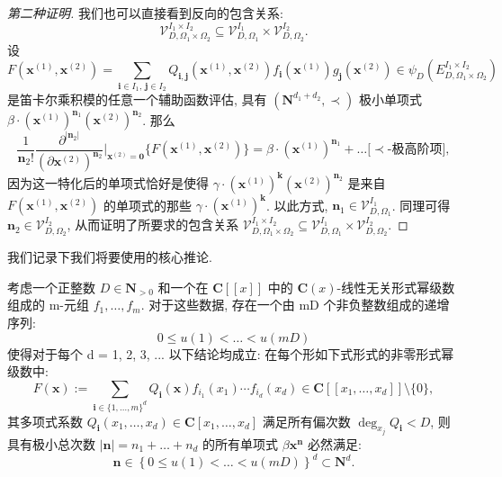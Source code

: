 \begin{proof}[第二种证明]
我们也可以直接看到反向的包含关系:
\[ \mathcal{V}_{D,\Omega_1\times\Omega_2}^{I_1\times I_2}\subseteq\mathcal{V}_{D,\Omega_1}^{I_1}\times\mathcal{V}_{D,\Omega_2}^{I_2}. \]
设
\[ F(\mathbf{x}^{(1)}, \mathbf{x}^{(2)}) = \sum_{\mathbf{i} \in I_1, \, \mathbf{j} \in I_2} Q_{\mathbf{i}, \mathbf{j}}(\mathbf{x}^{(1)}, \mathbf{x}^{(2)}) f_{\mathbf{i}}(\mathbf{x}^{(1)}) g_{\mathbf{j}}(\mathbf{x}^{(2)}) \in \psi_D\left(E_{D, \Omega_1 \times \Omega_2}^{I_1 \times I_2}\right) \]
是笛卡尔乘积模的任意一个辅助函数评估, 具有 \((\mathbf{N}^{d_1+d_2}, \prec)\) 极小单项式 \(\beta \cdot (\mathbf{x}^{(1)})^{\mathbf{n}_1}(\mathbf{x}^{(2)})^{\mathbf{n}_2}\). 那么
\[ \frac{1}{\mathbf{n}_{2}!} \frac{\partial^{|\mathbf{n}_{2}|}}{(\partial \mathbf{x}^{(2)})^{\mathbf{n}_{2}}} \Big|_{\mathbf{x}^{(2)} = \mathbf{0}} \Big\{ F(\mathbf{x}^{(1)}, \mathbf{x}^{(2)}) \Big\} = \beta \cdot (\mathbf{x}^{(1)})^{\mathbf{n}_{1}} + \dots \Big[ \prec \text{-极高阶项} \Big], \]
因为这一特化后的单项式恰好是使得 \(\gamma \cdot (\mathbf{x}^{(1)})^{\mathbf{k}}(\mathbf{x}^{(2)})^{\mathbf{n}_2}\) 是来自 \(F(\mathbf{x}^{(1)},\mathbf{x}^{(2)})\) 的单项式的那些 \(\gamma \cdot (\mathbf{x}^{(1)})^{\mathbf{k}}\). 
以此方式, \(\mathbf{n}_1 \in \mathcal{V}_{D,\Omega_1}^{I_1}\). 
同理可得 \(\mathbf{n}_2 \in \mathcal{V}_{D,\Omega_2}^{I_2}\), 从而证明了所要求的包含关系 \(\mathcal{V}_{D,\Omega_1 \times \Omega_2}^{I_1 \times I_2} \subseteq \mathcal{V}_{D,\Omega_1}^{I_1} \times \mathcal{V}_{D,\Omega_2}^{I_2}\).
\end{proof}

我们记录下我们将要使用的核心推论.

\begin{corollary}\label{cor:3.1.11}
考虑一个正整数 \(D \in \mathbf{N}_{>0}\) 和一个在 \(\mathbf{C}[\![x]\!]\) 中的 \(\mathbf{C}(x)\)-线性无关形式幂级数组成的 m-元组 \(f_1, \ldots, f_m\). 
对于这些数据, 存在一个由 mD 个非负整数组成的递增序列:
\[ 0 \le u(1) < \dots < u(mD) \]
使得对于每个 d = 1, 2, 3, ... 以下结论均成立:
在每个形如下式形式的非零形式幂级数中:
\[ F(\mathbf{x}) := \sum_{\mathbf{i} \in \{1, \dots, m\}^d} Q_{\mathbf{i}}(\mathbf{x}) f_{i_1}(x_1) \cdots f_{i_d}(x_d) \in \mathbf{C}[\![x_1, \dots, x_d]\!] \setminus \{0\}, \]
其多项式系数 \(Q_{\mathbf{i}}(x_1, \dots, x_d) \in \mathbf{C}[x_1, \dots, x_d]\) 满足所有偏次数 \(\deg_{x_j} Q_{\mathbf{i}} < D\), 
则具有极小总次数 \(|\mathbf{n}| = n_1 + \dots + n_d\) 的所有单项式 \(\beta \mathbf{x}^{\mathbf{n}}\) 必然满足:
\[ \mathbf{n} \in \left\{ 0 \le u(1) < \dots < u(mD) \right\} ^d \subset \mathbf{N}^d. \]
\end{corollary}

